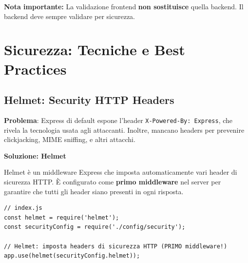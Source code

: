 \documentclass[11pt,a4paper]{article}
\newcommand{\code}[1]{\texttt{#1}}
\newcommand{\important}[1]{\textcolor{red!80!black}{\textbf{#1}}}
\begin{document}
\textbf{Nota importante:} La validazione frontend \important{non sostituisce} quella backend. Il backend deve sempre validare per sicurezza.

\section{Sicurezza: Tecniche e Best Practices}

\subsection{Helmet: Security HTTP Headers}

\important{Problema}: Express di default espone l'header \code{X-Powered-By: Express}, che rivela la tecnologia usata agli attaccanti. Inoltre, mancano headers per prevenire clickjacking, MIME sniffing, e altri attacchi.

\textbf{Soluzione: Helmet}

Helmet è un middleware Express che imposta automaticamente vari header di sicurezza HTTP. È configurato come \important{primo middleware} nel server per garantire che tutti gli header siano presenti in ogni risposta.

\begin{lstlisting}[caption=Configurazione Helmet nel Server]
// index.js
const helmet = require('helmet');
const securityConfig = require('./config/security');

// Helmet: imposta headers di sicurezza HTTP (PRIMO middleware!)
app.use(helmet(securityConfig.helmet));
\end{lstlisting}
\end{document}
